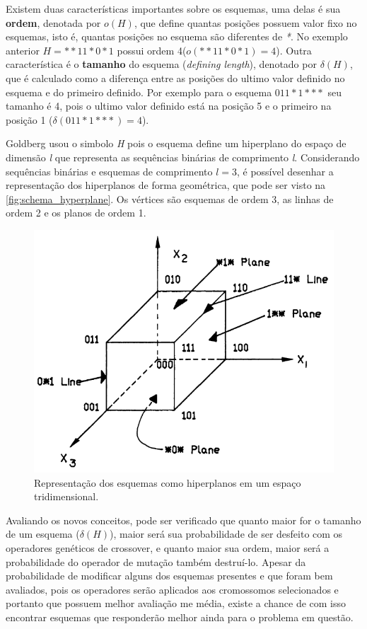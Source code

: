 Existem duas características importantes sobre os esquemas, uma delas é sua \textbf{ordem}, denotada por \(o(H)\), que define quantas posições possuem valor fixo no esquemas, isto é, quantas posições no esquema são diferentes de \textit{*}. No exemplo anterior \(H=**11*0*1\) possui ordem 4(\(o(**11*0*1) = 4\)). Outra característica é o \textbf{tamanho} do esquema (\textit{defining length}), denotado por \(\delta(H)\), que é calculado como a diferença entre as posições do ultimo valor definido no esquema e do primeiro definido. Por exemplo para o esquema \(011*1***\) seu tamanho é 4, pois o ultimo valor definido está na posição 5 e o primeiro na posição 1 (\(\delta(011*1***) = 4\)). 

Goldberg usou o simbolo \textit{H} pois o esquema define um hiperplano do espaço de dimensão \textit{l} que representa as sequências binárias de comprimento \textit{l}. Considerando sequências binárias e esquemas de comprimento \(l=3\), é possível desenhar a representação dos hiperplanos de forma geométrica, que pode ser visto na \autoref{fig:schema_hyperplane}. Os vértices são esquemas de ordem 3, as linhas de ordem 2 e os planos de ordem 1.

\begin{figure}[ht]
	\centering
	\includegraphics[width=0.75\linewidth]{imagens/schema_hyperplane.png}
	\caption{Representação dos esquemas como hiperplanos em um espaço tridimensional. \cite{Goldberg1989}}
	\label{fig:schema_hyperplane}
\end{figure}

Avaliando os novos conceitos, pode ser verificado que quanto maior for o tamanho de um esquema (\(\delta(H)\)), maior será sua probabilidade de ser desfeito com os operadores genéticos de crossover, e quanto maior sua ordem, maior será a probabilidade do operador de mutação também destruí-lo. Apesar da probabilidade de modificar alguns dos esquemas presentes e que foram bem avaliados, pois os operadores serão aplicados aos cromossomos selecionados e portanto que possuem melhor avaliação me média, existe a chance de com isso encontrar esquemas que responderão melhor ainda para o problema em questão. 

